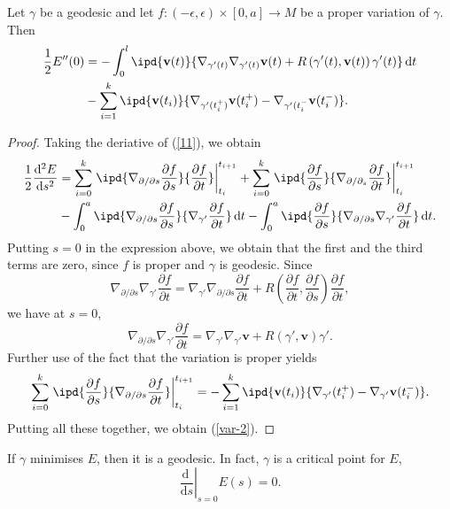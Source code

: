 \begin{proposition}
  Let $\gamma$ be a geodesic and let $f:(-\epsilon ,\epsilon )\times [0,a]\to M$ be a proper variation of $\gamma$.  Then
  \begin{align}
    \frac{1}{2}E''(0)&=-\int_0^{l}\ipd{\mathbf{v}(t)}{\nabla _{\gamma'(t)}\nabla _{\gamma'(t)}\mathbf{v}(t)+R\left( \gamma'(t),\mathbf{v}(t) \right) \gamma'(t)}\,\mathrm{d}t\notag\\
    &-\sum_{i=1}^{k} \ipd{\mathbf{v}(t_i)}{\nabla _{\gamma'(t_i^+)}\mathbf{v}(t_i^+)-\nabla _{\gamma'(t_i^{-}}\mathbf{v}(t_i^{-})}\label{var-2}
  .\end{align}
\end{proposition}
\begin{proof}
Taking the deriative of (\ref{11}), we obtain
\begin{align*}
  \frac{1}{2}\frac{\mathrm{d}^2E}{\mathrm{d}s^2}&= \sum_{i=0}^{k} \left.\ipd{\nabla _{\partial /\partial s} \frac{\partial f}{\partial s} }{\frac{\partial f}{\partial t} }\right|_{t_i}^{t_{i+1}}+\sum_{i=0}^{k} \left.\ipd{\frac{\partial f}{\partial s} }{\nabla _{\partial /\partial_s} \frac{\partial f}{\partial t} }\right|_{t_{i}}^{t_{i+1}}\\
      &- \int_0^{a}\ipd{\nabla _{\partial /\partial s} \frac{\partial f}{\partial s} }{\nabla _{\gamma'} \frac{\partial f}{\partial t} }\,\mathrm{d}t-\int_0^{a}\ipd{\frac{\partial f}{\partial s} }{\nabla _{\partial /\partial s} \nabla _{\gamma'} \frac{\partial f}{\partial t} }\,\mathrm{d}t
.\end{align*}
Putting $s=0$ in the expression above, we obtain that the first and the third terms are zero, since $f$ is proper and $\gamma$ is geodesic. Since
\[
  \nabla _{\partial /\partial s}\nabla _{\gamma'} \frac{\partial f}{\partial t} =\nabla _{\gamma'}\nabla _{\partial / \partial s}\frac{\partial f}{\partial t} +R\left( \frac{\partial f}{\partial t} ,\frac{\partial f}{\partial s}  \right) \frac{\partial f}{\partial t} ,
\] 
we have at $s=0$,
\[
  \nabla _{ \partial /\partial s}\nabla _{\gamma'} \frac{\partial f}{\partial t} = \nabla _{\gamma'}\nabla _{\gamma'}\mathbf{v}+R\left( \gamma',\mathbf{v} \right) \gamma'.
\] 
Further use of the fact that the variation is proper yields
\begin{equation}
  \sum_{i=0}^{k} \left.\ipd{\frac{\partial f}{\partial s} }{\nabla _{\partial /\partial s}\frac{\partial f}{\partial t} }\right|_{t_{i}}^{t_{i+1}}=-\sum_{i=1}^{k} \ipd{\mathbf{v}(t_i)}{\nabla _{\gamma'}(t_{i}^{+})-\nabla _{\gamma'}\mathbf{v}(t_i^{-})}.
\end{equation}
Putting all these together, we obtain (\ref{var-2}).

\end{proof}
 \begin{lemma}
   If $\gamma$ minimises $E $, then it is a geodesic. In fact, $\gamma$ is a critical point for $E$,
   \[
     \left.\frac{\mathrm{d}~}{\mathrm{d}s}\right|_{s=0}E(s)=0.
   \] 
 \end{lemma}

